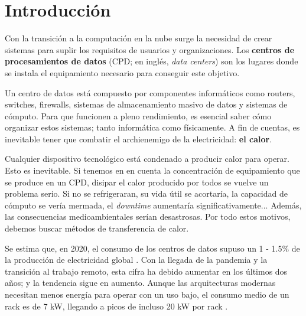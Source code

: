 


\chapter{Introducción}

Con la transición a la computación en la nube surge la necesidad de crear sistemas para suplir los requisitos de usuarios y organizaciones. Los \textbf{centros de procesamientos de datos} (CPD; en inglés, \textit{data centers}) son los lugares donde se instala el equipamiento necesario para conseguir este objetivo.

Un centro de datos está compuesto por componentes informáticos como routers, switches, firewalls, sistemas de almacenamiento masivo de datos y sistemas de cómputo. Para que funcionen a pleno rendimiento, es esencial saber cómo organizar estos sistemas; tanto informática como físicamente. A fin de cuentas, es inevitable tener que combatir el archienemigo de la electricidad: \textbf{el calor}.

Cualquier dispositivo tecnológico está condenado a producir calor para operar. Esto es inevitable. Si tenemos en en cuenta la concentración de equipamiento que se produce en un CPD, disipar el calor producido por todos se vuelve un problema serio. Si no se refrigeraran, su vida útil se acortaría, la capacidad de cómputo se vería mermada, el \textit{downtime} aumentaría significativamente... Además, las consecuencias medioambientales serían desastrosas. Por todo estos motivos, debemos buscar métodos de transferencia de calor.

Se estima que, en 2020, el consumo de los centros de datos supuso un 1 - 1.5\% de la producción de electricidad global \cite{mytton-dc}. Con la llegada de la pandemia y la transición al trabajo remoto, esta cifra ha debido aumentar en los últimos dos años; y la tendencia sigue en aumento. Aunque las arquitecturas modernas necesitan menos energía para operar con un uso bajo, el consumo medio de un rack es de 7 kW, llegando a picos de incluso 20 kW por rack \cite{datacenters-density}.

